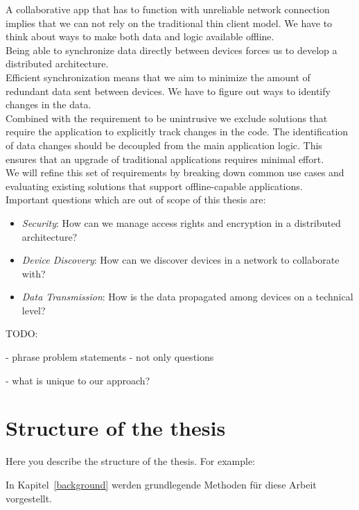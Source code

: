 A collaborative app that has to function with unreliable network connection implies that we can not rely on the traditional thin client model.
We have to think about ways to make both data and logic available offline.\\

Being able to synchronize data directly between devices forces us to develop a distributed architecture.\\

Efficient synchronization means that we aim to minimize the amount of redundant data sent between devices.
We have to figure out ways to identify changes in the data.\\

Combined with the requirement to be unintrusive we exclude solutions that require the application to explicitly track changes in the code.
The identification of data changes should be decoupled from the main application logic.
This ensures that an upgrade of traditional applications requires minimal effort.\\

We will refine this set of requirements by breaking down common use cases and evaluating existing solutions that support offline-capable applications.\\

Important questions which are out of scope of this thesis are:

\begin{itemize}
\item \emph{Security}: How can we manage access rights and encryption in a distributed architecture?
\item \emph{Device Discovery}: How can we discover devices in a network to collaborate with?
\item \emph{Data Transmission}: How is the data propagated among devices on a technical level?
\end{itemize}

TODO:

- phrase problem statements - not only questions

- what is unique to our approach?

\section{Structure of the thesis}
Here you describe the structure of the thesis. For example:

In Kapitel~\ref{background} werden grundlegende Methoden für diese Arbeit vorgestellt.